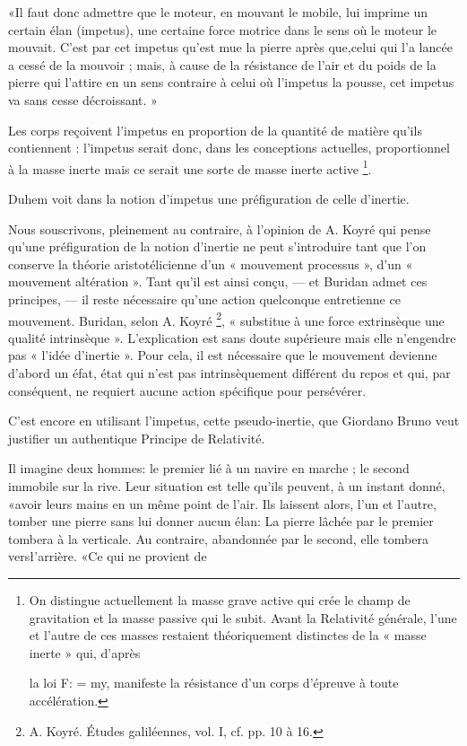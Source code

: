 «Il faut donc admettre que le moteur, en mouvant le mobile, lui
imprime un certain élan (impetus), une certaine force motrice dans le
sens où le moteur le mouvait. C’est par cet impetus qu’est mue la pierre
après que,celui qui l’a lancée a cessé de la mouvoir ; mais, à cause de la
résistance de l’air et du poids de la pierre qui l’attire en un sens contraire
à celui où l’impetus la pousse, cet impetus va sans cesse décroissant. »

Les corps reçoivent l’impetus en proportion de la quantité de matière
qu’ils contiennent : l’impetus serait donc, dans les conceptions actuelles,
proportionnel à la masse inerte mais ce serait une sorte de masse inerte
active \footnote{On distingue actuellement la masse grave active qui crée le champ de gravitation
et la masse passive qui le subit. Avant la Relativité générale, l’une et l’autre
de ces masses restaient théoriquement distinctes de la « masse inerte » qui, d’après

la loi F: = my, manifeste la résistance d’un corps d’épreuve à toute accélération.}.

Duhem voit dans la notion d’impetus une préfiguration de celle
d'inertie.

Nous souscrivons, pleinement au contraire, à l’opinion de A. Koyré
qui pense qu’une préfiguration de la notion d’inertie ne peut s’introduire
tant que l’on conserve la théorie aristotélicienne d’un « mouvement
processus », d’un « mouvement altération ». Tant qu’il est ainsi conçu,
— et Buridan admet ces principes, — il reste nécessaire qu’une action
quelconque entretienne ce mouvement. Buridan, selon A. Koyré \footnote{A. Koyré. Études galiléennes, vol. I, cf. pp. 10 à 16.},
« substitue à une force extrinsèque une qualité intrinsèque ». L’explication
est sans doute supérieure mais elle n’engendre pas « l’idée d’inertie ».
Pour cela, il est nécessaire que le mouvement devienne d’abord un éfat,
état qui n’est pas intrinsèquement différent du repos et qui, par conséquent,
ne requiert aucune action spécifique pour persévérer.

C’est encore en utilisant l’impetus, cette pseudo-inertie, que Giordano
Bruno veut justifier un authentique Principe de Relativité.

Il imagine deux hommes: le premier lié à un navire en marche ; le
second immobile sur la rive. Leur situation est telle qu’ils peuvent, à un
instant donné, «avoir leurs mains en un même point de l’air. Ils laissent
alors, l’un et l’autre, tomber une pierre sans lui donner aucun élan: La
pierre lâchée par le premier tombera à la verticale. Au contraire, abandonnée
par le second, elle tombera vers\l’arrière. «Ce qui ne provient de

